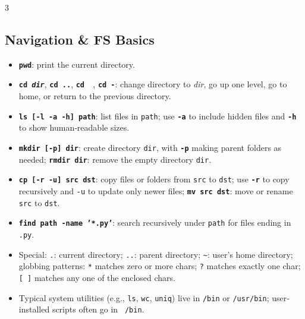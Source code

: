 \documentclass[6pt,landscape]{article}
\newcommand{\cmd}[1]{\textbf{\texttt{\textcolor{cmdcolor}{#1}}}}
\newcommand{\var}[1]{\emph{\textcolor{varcolor}{#1}}}
\begin{document}
\tiny
\begin{multicols}{3}

\subsection{Navigation \& FS Basics}\label{sec:navigation}
\begin{itemize}
  \item \cmd{pwd}: print the current directory.
  \item \cmd{cd \var{dir}}, \cmd{cd ..}, \cmd{cd ~}, \cmd{cd -}: change directory to \var{dir}, go up one level, go to home, or return to the previous directory.
  \item \cmd{ls [-l -a -h] \texttt{path}}: list files in \texttt{path}; use \cmd{-a} to include hidden files and \cmd{-h} to show human‐readable sizes.
  \item \cmd{mkdir [-p] \texttt{dir}}: create directory \texttt{dir}, with \cmd{-p} making parent folders as needed; \cmd{rmdir \texttt{dir}}: remove the empty directory \texttt{dir}.
  \item \cmd{cp [-r -u] \texttt{src} \texttt{dst}}: copy files or folders from \texttt{src} to \texttt{dst}; use \cmd{-r} to copy recursively and \texttt{-u} to update only newer files; \cmd{mv \texttt{src} \texttt{dst}}: move or rename \texttt{src} to \texttt{dst}.
  \item \cmd{find \texttt{path} -name '*.py'}: search recursively under \texttt{path} for files ending in \texttt{.py}.
  \item Special: \texttt{.}: current directory; \texttt{..}: parent directory; \texttt{\~}: user’s home directory; globbing patterns: \texttt{*} matches zero or more chars; \texttt{?} matches exactly one char; \texttt{[ ]} matches any one of the enclosed chars.
  \item Typical system utilities (e.g., \texttt{ls}, \texttt{wc}, \texttt{uniq}) live in \texttt{/bin} or \texttt{/usr/bin}; user‐installed scripts often go in \texttt{~/bin}.
\end{itemize}



\end{multicols}
\end{document}
